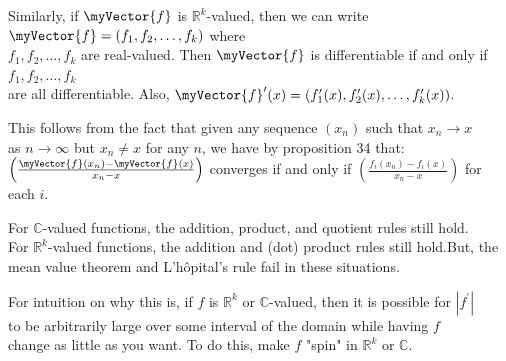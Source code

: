 \documentclass{book}
\newcommand{\teachComment}{
   \color{Orange}%
   \fontsize{12}{14}\selectfont%
}
\newcommand{\exOne}{%
   \color{Purple}%
   \fontsize{14}{16}\selectfont%
}
\newenvironment{myIndent}{%
   \begin{adjustwidth}{2.5em}{0em}%
}{%
   \end{adjustwidth}%
}
\newenvironment{myDindent}{%
   \begin{adjustwidth}{5em}{0em}%
}{%
   \end{adjustwidth}%
}
\newcommand{\retTwo}{\hfill\bigbreak}
\newcommand{\mVec}[1]{\myVector{#1}}
\begin{document}
Similarly, if $\mVec{f}$ is $\mathbb{R}^k$-valued, then we can write $\mVec{f} = (f_1, f_2, \ldots, f_k)$ where\\ $f_1, f_2, \ldots, f_k$ are real-valued. Then $\mVec{f}$ is differentiable if and only if $f_1, f_2, \ldots, f_k$\\ are all differentiable. Also, $\mVec{f}^\prime(x) = (f_1^\prime(x), f_2^\prime(x), \ldots, f^\prime_k(x))$.\retTwo

{\begin{myIndent}\exOne
   This follows from the fact that given any sequence $(x_n)$ such that $x_n \rightarrow x$\\ as $n \rightarrow \infty$ but $x_n \neq x$ for any $n$, we have by proposition 34 that:\\ $\left(\frac{\mVec{f}(x_n) - \mVec{f}(x)}{x_n-x}\right)$ converges if and only if $\left(\frac{f_i(x_n) - f_i(x)}{x_n-x}\right)$ for each $i$.\retTwo
\end{myIndent}}

For $\mathbb{C}$-valued functions, the addition, product, and quotient rules still hold.\\ For $\mathbb{R}^k$-valued functions, the addition and (dot) product rules still hold.\retTwo But, the mean value theorem and L'hôpital's rule fail in these situations.
{\begin{myDindent}\teachComment
   For intuition on why this is, if $f$ is $\mathbb{R}^k$ or $\mathbb{C}$-valued, then it is possible for $|f^\prime|$\\ to be arbitrarily large over some interval of the domain while having $f$\\ change as little as you want. To do this, make $f$ "spin" in $\mathbb{R}^k$ or $\mathbb{C}$.
\end{myDindent}}

\newpage
\end{document}
